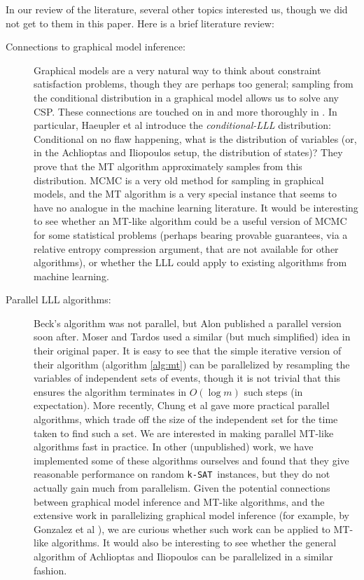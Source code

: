 \documentclass[twocolumn]{article}
\newcommand{\ksat}{\texttt{k-SAT}~}
\begin{document}
In our review of the literature, several other topics interested us, though we did not get to them in this paper.  Here is a brief literature review:
\begin{description}
  \item[Connections to graphical model inference:] Graphical models are a very natural way to think about constraint satisfaction problems, though they are perhaps too general; sampling from the conditional distribution in a graphical model allows us to solve any CSP.  These connections are touched on in \cite{freer2010probabilistic} and more thoroughly in \cite{haeupler2011new}.  In particular, Haeupler et al introduce the \emph{conditional-LLL} distribution: Conditional on no flaw happening, what is the distribution of variables (or, in the Achlioptas and Iliopoulos setup, the distribution of states)?  They prove that the MT algorithm approximately samples from this distribution.  MCMC is a very old method for sampling in graphical models, and the MT algorithm is a very special instance that seems to have no analogue in the machine learning literature.  It would be interesting to see whether an MT-like algorithm could be a useful version of MCMC for some statistical problems (perhaps bearing provable guarantees, via a relative entropy compression argument, that are not available for other algorithms), or whether the LLL could apply to existing algorithms from machine learning.
  \item[Parallel LLL algorithms:] Beck's algorithm was not parallel, but Alon \cite{alon1991parallel} published a parallel version soon after.  Moser and Tardos \cite{moser2010constructive} used a similar (but much simplified) idea in their original paper.  It is easy to see that the simple iterative version of their algorithm (algorithm \ref{alg:mt}) can be parallelized by resampling the variables of independent sets of events, though it is not trivial that this ensures the algorithm terminates in $O(\log m)$ such steps (in expectation).  More recently, Chung et al \cite{chung2014distributed} gave more practical parallel algorithms, which trade off the size of the independent set for the time taken to find such a set.  We are interested in making parallel MT-like algorithms fast in practice.  In other (unpublished) work, we have implemented some of these algorithms ourselves and found that they give reasonable performance on random \ksat instances, but they do not actually gain much from parallelism.  Given the potential connections between graphical model inference and MT-like algorithms, and the extensive work in parallelizing graphical model inference (for example, by Gonzalez et al \cite{gonzalez2011parallel}), we are curious whether such work can be applied to MT-like algorithms.  It would also be interesting to see whether the general algorithm of Achlioptas and Iliopoulos \cite{achlioptas2014random} can be parallelized in a similar fashion.
\end{description}



\end{document}
